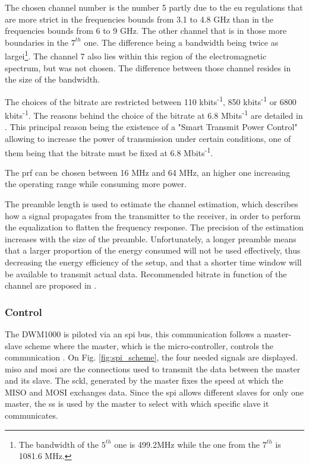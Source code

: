 The chosen channel number is the number 5 partly due to the \gls{eu} regulations that are more strict in the frequencies bounds from 3.1 to 4.8 GHz than in the frequencies bounds from 6 to 9 GHz\cite{eulaw}. The other channel that is in those more  boundaries in the $7^{th}$ one. The difference being a bandwidth being twice as largei\footnote{The bandwidth of the $5^{th}$ one is 499.2MHz while the one from the $7^{th}$ is 1081.6 MHz.}. The channel 7 also lies within this region of the electromagnetic spectrum, but was not chosen. The difference between those channel resides in the size of the bandwidth.
\vspace{2mm}

The choices of the bitrate are restricted between 110 kbits\textsuperscript{-1}, 850 kbits\textsuperscript{-1} or 6800 kbits\textsuperscript{-1}. The reasons behind the choice of the bitrate at 6.8 Mbits\textsuperscript{-1} are detailed in \cite{hannotier2019indoor}. This principal reason being the existence of a "Smart Transmit Power Control" allowing to increase the power of transmission under certain conditions, one of them being that the bitrate must be fixed at 6.8 Mbits\textsuperscript{-1}.
\vspace{2mm}

The \gls{prf} can be chosen between 16 MHz and 64 MHz, an higher one increasing the operating range while consuming more power.
\vspace{2mm}

The preamble length is used to estimate the channel estimation, which describes how a signal propagates from the transmitter to the receiver, in order to perform the equalization to flatten the frequency response. The precision of the estimation increases with the size of the preamble. Unfortunately, a longer preamble means that a larger proportion of the energy consumed will not be used effectively, thus decreasing the energy efficiency of the setup, and that a shorter time window will be available to transmit actual data.  Recommended bitrate in function of the channel are proposed in \cite{usermanual}.
\vspace{2mm}

\subsubsection{Control}

The DWM1000 is piloted via an \gls{spi} bus, this communication follows a master-slave scheme where the master, which is the micro-controller, controls the communication \cite{busspi}. On Fig. \ref{fig:spi_scheme}, the four needed signals are displayed. \gls{miso} and \gls{mosi} are the connections used to transmit the data between the master and its slave. The \gls{sckl}, generated by the master fixes the speed at which the MISO and MOSI exchanges data. Since the \gls{spi} allows different slaves for only one master, the \gls{ss} is used by the master to select with which specific slave it communicates. 


